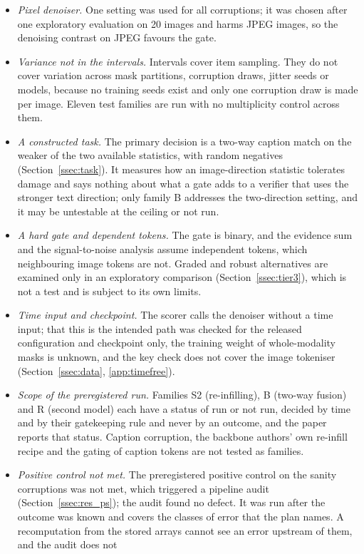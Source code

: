 \begin{itemize}
\item \emph{Pixel denoiser.} One setting was used for all corruptions; it was chosen after one exploratory evaluation on 20 images and
harms JPEG images, so the denoising contrast on JPEG favours the gate.
\item \emph{Variance not in the intervals.} Intervals cover item sampling. They do not cover variation across mask partitions, corruption
draws, jitter seeds or models, because no training seeds exist and only one corruption draw is made per image. Eleven test families
are run with no multiplicity control across them.
\item \emph{A constructed task.} The primary decision is a two-way caption match on the weaker of the two available statistics, with
random negatives (Section~\ref{ssec:task}). It measures how an image-direction statistic tolerates damage and says nothing about
what a gate adds to a verifier that uses the stronger text direction; only family B addresses the two-direction setting, and it may be
untestable at the ceiling or not run.
\item \emph{A hard gate and dependent tokens.} The gate is binary, and the evidence sum and the signal-to-noise analysis assume
independent tokens, which neighbouring image tokens are not. Graded and robust alternatives are examined only in an exploratory
comparison (Section~\ref{ssec:tier3}), which is not a test and is subject to its own limits.
\item \emph{Time input and checkpoint.} The scorer calls the denoiser without a time input; that this is the intended path was checked
for the released configuration and checkpoint only, the training weight of whole-modality masks is unknown, and the key check does not
cover the image tokeniser (Section~\ref{ssec:data}, \ref{app:timefree}).
\item \emph{Scope of the preregistered run.} Families S2 (re-infilling), B (two-way fusion) and R (second model) each have a status of
run or not run, decided by time and by their gatekeeping rule and never by an outcome, and the paper reports that status.
Caption corruption, the backbone authors' own re-infill recipe and the gating of caption tokens are not tested as families.
\item \emph{Positive control not met.} The preregistered positive control on the sanity corruptions was not met, which triggered a
pipeline audit (Section~\ref{ssec:res_ps}); the audit found no defect. It was run after the outcome was known and covers the classes
of error that the plan names. A recomputation from the stored arrays cannot see an error upstream of them, and the audit does not

\end{itemize}
